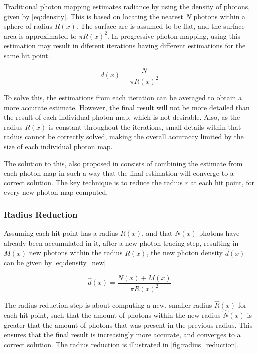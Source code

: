\documentclass[main.tex]{subfiles}
\begin{document}
Traditional photon mapping estimates radiance by using the density of photons, given by \cref{eq:density}. This is based on locating the nearest $N$ photons within a sphere of radius $R(x)$. The surface are is assumed to be flat, and the surface area is approximated to $\pi R(x)^{2}$. In progressive photon mapping, using this estimation may result in diferent iterations having different estimations for the same hit point.

\begin{figure}[!htp]
  \begin{equation}
    d(x) = \frac{N}{\pi R(x)^{2}}
  \label{eq:density}
  \end{equation}
\end{figure}

To solve this, the estimations from each iteration can be averaged to obtain a more accurate estimate. However, the final result will not be more detailed than the result of each individual photon map, which is not desirable. Also, as the radius $R(x)$ is constant throughout the iterations, small details within that radius cannot be correctly solved, making the overall accuraccy limited by the size of each individual photon map.

The solution to this, also proposed in \cite{hachisuka2008progressive} consists of combining the estimate from each photon map in such a way that the final estimation will converge to a correct solution. The key technique is to reduce the radius $r$ at each hit point, for every new photon map computed.

\subsubsection{Radius Reduction}

Assuming each hit point has a radius $R(x)$, and that $N(x)$ photons have already been accumulated in it, after a new photon tracing step, resulting in $M(x)$ new photons within the radius $R(x)$, the new photon density $\hat{d}(x)$ can be given by \cref{eq:density_new}

\begin{figure}[!htp]
  \begin{equation}
    \hat{d}(x) = \frac{N(x) + M(x)}{\pi R(x)^{2}}
  \label{eq:density_new}
  \end{equation}
\end{figure}

The radius reduction step is about computing a new, smaller radius $\hat{R}(x)$ for each hit point, such that the amount of photons within the new radius $\hat{N}(x)$ is greater that the amount of photons that was present in the previous radius. This ensures that the final result is increasingly more accurate, and converges to a correct solution. The radius reduction is illustrated in \cref{fig:radius_reduction}.
\end{document}
